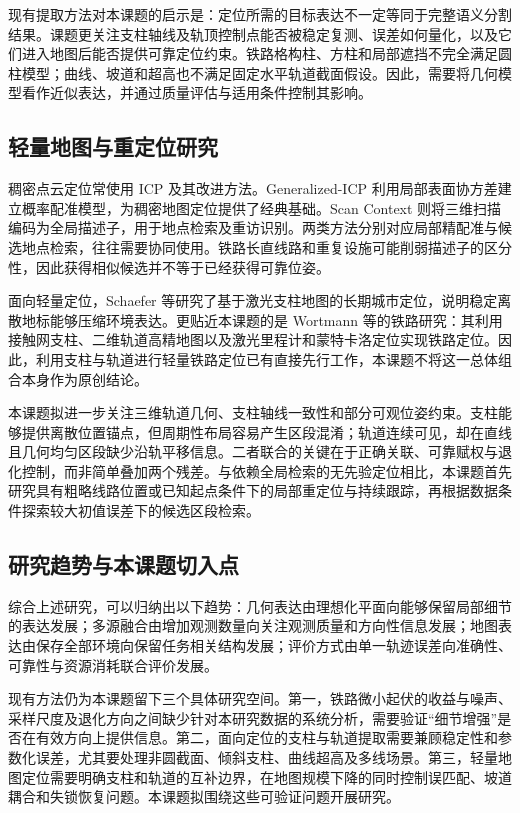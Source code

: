 \documentclass[UTF8,a4paper,12pt,fontset=fandol]{ctexart}
\begin{document}
现有提取方法对本课题的启示是：定位所需的目标表达不一定等同于完整语义分割结果。课题更关注支柱轴线及轨顶控制点能否被稳定复测、误差如何量化，以及它们进入地图后能否提供可靠定位约束。铁路格构柱、方柱和局部遮挡不完全满足圆柱模型；曲线、坡道和超高也不满足固定水平轨道截面假设。因此，需要将几何模型看作近似表达，并通过质量评估与适用条件控制其影响。

\subsection{轻量地图与重定位研究}

稠密点云定位常使用 ICP 及其改进方法。Generalized-ICP 利用局部表面协方差建立概率配准模型，为稠密地图定位提供了经典基础\cite{segal2009gicp}。Scan Context 则将三维扫描编码为全局描述子，用于地点检索及重访识别\cite{kim2018scancontext}。两类方法分别对应局部精配准与候选地点检索，往往需要协同使用。铁路长直线路和重复设施可能削弱描述子的区分性，因此获得相似候选并不等于已经获得可靠位姿。

面向轻量定位，Schaefer 等研究了基于激光支柱地图的长期城市定位，说明稳定离散地标能够压缩环境表达\cite{schaefer2019poles}。更贴近本课题的是 Wortmann 等的铁路研究：其利用接触网支柱、二维轨道高精地图以及激光里程计和蒙特卡洛定位实现铁路定位\cite{wortmann2025rail}。因此，利用支柱与轨道进行轻量铁路定位已有直接先行工作，本课题不将这一总体组合本身作为原创结论。

本课题拟进一步关注三维轨道几何、支柱轴线一致性和部分可观位姿约束。支柱能够提供离散位置锚点，但周期性布局容易产生区段混淆；轨道连续可见，却在直线且几何均匀区段缺少沿轨平移信息。二者联合的关键在于正确关联、可靠赋权与退化控制，而非简单叠加两个残差。与依赖全局检索的无先验定位相比，本课题首先研究具有粗略线路位置或已知起点条件下的局部重定位与持续跟踪，再根据数据条件探索较大初值误差下的候选区段检索。

\subsection{研究趋势与本课题切入点}

综合上述研究，可以归纳出以下趋势：几何表达由理想化平面向能够保留局部细节的表达发展；多源融合由增加观测数量向关注观测质量和方向性信息发展；地图表达由保存全部环境向保留任务相关结构发展；评价方式由单一轨迹误差向准确性、可靠性与资源消耗联合评价发展。

现有方法仍为本课题留下三个具体研究空间。第一，铁路微小起伏的收益与噪声、采样尺度及退化方向之间缺少针对本研究数据的系统分析，需要验证“细节增强”是否在有效方向上提供信息。第二，面向定位的支柱与轨道提取需要兼顾稳定性和参数化误差，尤其要处理非圆截面、倾斜支柱、曲线超高及多线场景。第三，轻量地图定位需要明确支柱和轨道的互补边界，在地图规模下降的同时控制误匹配、坡道耦合和失锁恢复问题。本课题拟围绕这些可验证问题开展研究。
\end{document}
